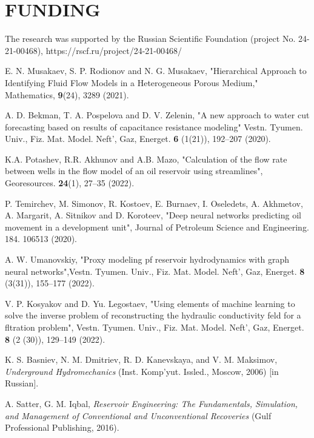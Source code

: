 \documentclass[
11pt,%
tightenlines,%
twoside,%
onecolumn,%
nofloats,%
nobibnotes,%
nofootinbib,%
superscriptaddress,%
noshowpacs,%
centertags]%
{revtex4}
\begin{document}
\section{FUNDING}
The research was supported by the Russian Scientific Foundation (project No. 24-21-00468), https://rscf.ru/project/24-21-00468/


%
%

\begin{thebibliography}{99}
 E. N. Musakaev, S. P. Rodionov and N. G. Musakaev, "Hierarchical Approach to Identifying Fluid Flow Models in a Heterogeneous Porous Medium," Mathematics, {\bf 9}(24), 3289 (2021).

 A. D. Bekman, T. A. Pospelova and D. V. Zelenin,  "A new approach to water cut forecasting based on results of capacitance resistance modeling" Vestn. Tyumen. Univ., Fiz. Mat. Model. Neft', Gaz, Energet. {\bf 6} (1(21)), 192--207 (2020).

 K.A. Potashev, R.R. Akhunov and  A.B. Mazo, "Calculation of the flow rate between wells in the flow model of an oil reservoir using streamlines", Georesources. {\bf 24}(1), 27--35 (2022).

P. Temirchev, M. Simonov, R. Kostoev, E. Burnaev, I. Oseledets, A. Akhmetov, A. Margarit, A. Sitnikov and D. Koroteev, "Deep neural networks predicting oil movement in a development unit", Journal of Petroleum Science and Engineering. 184. 106513 (2020).

A. W. Umanovskiy, "Proxy modeling pf reservoir hydrodynamics with graph neural networks",Vestn. Tyumen. Univ., Fiz. Mat. Model. Neft', Gaz, Energet. {\bf 8} (3(31)), 155--177 (2022).

V. P. Kosyakov and D. Yu. Legostaev, "Using elements of machine learning to solve the inverse problem of reconstructing the hydraulic conductivity feld for a fltration problem", Vestn. Tyumen. Univ., Fiz. Mat. Model. Neft', Gaz, Energet. {\bf 8} (2 (30)), 129--149 (2022).

K. S. Basniev, N. M. Dmitriev, R. D. Kanevskaya, and V. M. Maksimov, \textit{Underground Hydromechanics} (Inst. Komp'yut. Issled., Moscow, 2006) [in Russian].

A. Satter, G. M. Iqbal, \textit{Reservoir Engineering: The Fundamentals, Simulation, and Management of Conventional and Unconventional Recoveries} (Gulf Professional Publishing, 2016).


\end{thebibliography}
\end{document}
